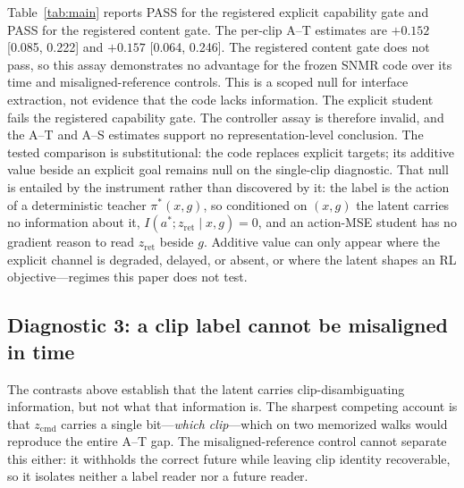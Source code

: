 \documentclass[conference]{IEEEtran}
\newcommand{\zcmd}{\ensuremath{z_{\mathrm{cmd}}}}
\newif\ifeexplicitvalid
\newif\ifepositivecontent
\newcommand{\EATFirst}{+0.152}
\newcommand{\EATFirstLow}{0.085}
\newcommand{\EATFirstHigh}{0.222}
\newcommand{\EATSecond}{+0.157}
\newcommand{\EATSecondLow}{0.064}
\newcommand{\EATSecondHigh}{0.246}
\newcommand{\EExplicitGate}{PASS}
\newcommand{\EPositiveGate}{PASS}
\begin{document}
Table~\ref{tab:main} reports \EExplicitGate{} for the registered explicit capability
gate and \EPositiveGate{} for the registered content gate.  The per-clip A--T estimates
are $\EATFirst$ [\EATFirstLow, \EATFirstHigh] and $\EATSecond$
[\EATSecondLow, \EATSecondHigh].
\ifeexplicitvalid
  The explicit student verifies task and trainer feasibility, and \zcmd{} destruction
  verifies within-policy command use on both arms, not only on the control arm.
  \ifepositivecontent The registered
  contrasts show that neither absolute progress through a clip nor the matched-phase
  other-trajectory control is sufficient to match A.  Under this controller and
  two-walk assay, the frozen SNMR code therefore
  provides control-usable trajectory information beyond absolute within-clip time.
  \else The registered content gate does not pass, so this assay demonstrates no
  advantage for the frozen SNMR code over its time and misaligned-reference controls.  This is
  a scoped null for interface extraction, not evidence that the code lacks information.\fi
\else
  The explicit student fails the registered capability gate.  The controller assay is
  therefore invalid, and the A--T and A--S estimates support no representation-level
  conclusion.
\fi
The tested comparison is substitutional: the code replaces explicit targets; its
additive value beside an explicit goal remains null on the single-clip diagnostic.
That null is entailed by the instrument rather than discovered by it: the label is the
action of a deterministic teacher $\pi^*(x,g)$, so conditioned on $(x,g)$ the latent
carries no information about it, $I(a^*;z_{\mathrm{ret}}\mid x,g)=0$, and an action-MSE
student has no gradient reason to read $z_{\mathrm{ret}}$ beside $g$.  Additive value can
only appear where the explicit channel is degraded, delayed, or absent, or where the
latent shapes an RL objective---regimes this paper does not test.

\subsection{Diagnostic 3: a clip label cannot be misaligned in time}
\label{sec:phase}
The contrasts above establish that the latent carries clip-disambiguating information, but
not what that information is.  The sharpest competing account is that \zcmd{} carries a
single bit---\emph{which clip}---which on two memorized walks would reproduce the entire
A--T gap.  The misaligned-reference control cannot separate this either: it withholds the correct
future while leaving clip identity recoverable, so it isolates neither a label reader nor a
future reader.
\end{document}
